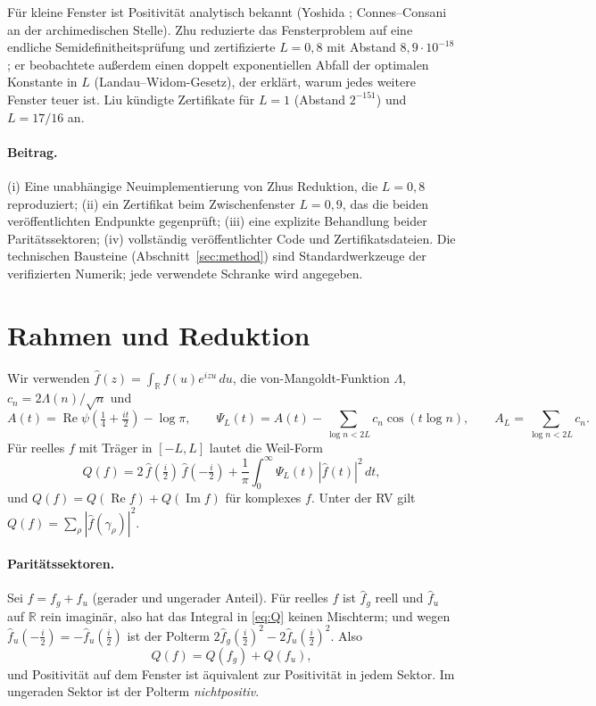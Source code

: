 \documentclass[11pt,a4paper]{article}
\theoremstyle{definition}
\renewcommand{\Re}{\operatorname{Re}}
\renewcommand{\Im}{\operatorname{Im}}
\begin{document}
Für kleine Fenster ist Positivität analytisch bekannt (Yoshida \cite{Yoshida92}; Connes--Consani \cite{CC21} an der archimedischen Stelle). Zhu \cite{Zhu26} reduzierte das Fensterproblem auf eine endliche Semidefinitheitsprüfung und zertifizierte $L=0{,}8$ mit Abstand $8{,}9\cdot10^{-18}$; er beobachtete außerdem einen doppelt exponentiellen Abfall der optimalen Konstante in $L$ (Landau--Widom-Gesetz), der erklärt, warum jedes weitere Fenster teuer ist. Liu \cite{Liu26} kündigte Zertifikate für $L=1$ (Abstand $2^{-151}$) und $L=17/16$ an.

\paragraph{Beitrag.} (i) Eine unabhängige Neuimplementierung von Zhus Reduktion, die $L=0{,}8$ reproduziert; (ii) ein Zertifikat beim Zwischenfenster $L=0{,}9$, das die beiden veröffentlichten Endpunkte gegenprüft; (iii) eine explizite Behandlung beider Paritätssektoren; (iv) vollständig veröffentlichter Code und Zertifikatsdateien. Die technischen Bausteine (Abschnitt~\ref{sec:method}) sind Standardwerkzeuge der verifizierten Numerik; jede verwendete Schranke wird angegeben.

\section{Rahmen und Reduktion}

Wir verwenden $\hat f(z)=\int_{\mathbb R} f(u)e^{izu}\,du$, die von-Mangoldt-Funktion $\Lambda$, $c_n=2\Lambda(n)/\sqrt n$ und
\[
A(t)=\Re\psi\!\left(\tfrac14+\tfrac{it}2\right)-\log\pi,\qquad
\Psi_L(t)=A(t)-\sum_{\log n<2L}c_n\cos(t\log n),\qquad A_L=\sum_{\log n<2L}c_n .
\]
Für reelles $f$ mit Träger in $[-L,L]$ lautet die Weil-Form
\begin{equation}\label{eq:Q}
Q(f)=2\,\hat f(\tfrac i2)\,\hat f(-\tfrac i2)+\frac1\pi\int_0^\infty \Psi_L(t)\,|\hat f(t)|^2\,dt ,
\end{equation}
und $Q(f)=Q(\Re f)+Q(\Im f)$ für komplexes $f$. Unter der RV gilt $Q(f)=\sum_\rho|\hat f(\gamma_\rho)|^2$.

\paragraph{Paritätssektoren.} Sei $f=f_g+f_u$ (gerader und ungerader Anteil). Für reelles $f$ ist $\hat f_g$ reell und $\hat f_u$ auf $\mathbb R$ rein imaginär, also hat das Integral in \eqref{eq:Q} keinen Mischterm; und wegen $\hat f_u(-\tfrac i2)=-\hat f_u(\tfrac i2)$ ist der Polterm $2\hat f_g(\tfrac i2)^2-2\hat f_u(\tfrac i2)^2$. Also
\[
Q(f)=Q(f_g)+Q(f_u),
\]
und Positivität auf dem Fenster ist äquivalent zur Positivität in jedem Sektor. Im ungeraden Sektor ist der Polterm \emph{nichtpositiv}.
\end{document}
